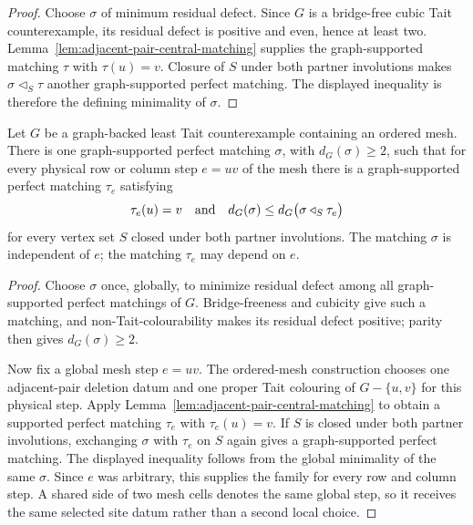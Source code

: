 \begin{proof}
Choose \(\sigma\) of minimum residual defect.  Since \(G\) is a bridge-free
cubic Tait counterexample, its residual defect is positive and even, hence at
least two.  Lemma~\ref{lem:adjacent-pair-central-matching} supplies the
graph-supported matching \(\tau\) with \(\tau(u)=v\).  Closure of \(S\) under
both partner involutions makes
\(\sigma\mathbin\triangleleft_S\tau\) another graph-supported perfect
matching.  The displayed inequality is therefore the defining minimality of
\(\sigma\).
\end{proof}

\begin{corollary}
\label{cor:ordered-mesh-rigid-site-matchings}
Let \(G\) be a graph-backed least Tait counterexample containing an ordered
mesh.  There is one graph-supported perfect matching \(\sigma\), with
\(d_G(\sigma)\geq2\), such that for every physical row or column step
\(e=uv\) of the mesh there is a graph-supported perfect matching
\(\tau_e\) satisfying
\[
  \tau_e(u)=v
  \quad\hbox{and}\quad
  d_G(\sigma)
  \leq d_G\bigl(\sigma\mathbin\triangleleft_S\tau_e\bigr)
\]
for every vertex set \(S\) closed under both partner involutions.
The matching \(\sigma\) is independent of \(e\); the matching \(\tau_e\)
may depend on \(e\).
\end{corollary}

\begin{proof}
Choose \(\sigma\) once, globally, to minimize residual defect among all
graph-supported perfect matchings of \(G\).  Bridge-freeness and cubicity give
such a matching, and non-Tait-colourability makes its residual defect positive;
parity then gives \(d_G(\sigma)\geq2\).

Now fix a global mesh step \(e=uv\).  The ordered-mesh construction chooses
one adjacent-pair deletion datum and one proper Tait colouring of
\(G-\{u,v\}\) for this physical step.  Apply
Lemma~\ref{lem:adjacent-pair-central-matching} to obtain a supported perfect
matching \(\tau_e\) with \(\tau_e(u)=v\).  If \(S\) is closed under both
partner involutions, exchanging \(\sigma\) with \(\tau_e\) on \(S\) again
gives a graph-supported perfect matching.  The displayed inequality follows
from the global minimality of the same \(\sigma\).  Since \(e\) was arbitrary,
this supplies the family for every row and column step.  A shared side of two
mesh cells denotes the same global step, so it receives the same selected
site datum rather than a second local choice.
\end{proof}

